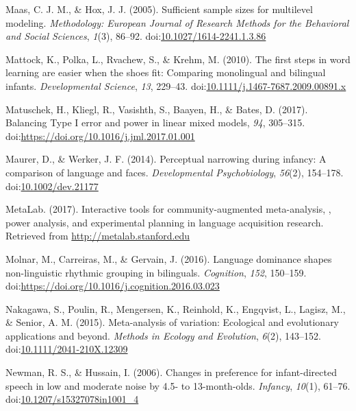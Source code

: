 \documentclass[,man,floatsintext]{apa6}
\begin{document}
\leavevmode\hypertarget{ref-maas_2005}{}%
Maas, C. J. M., \& Hox, J. J. (2005). Sufficient sample sizes for multilevel modeling. \emph{Methodology: European Journal of Research Methods for the Behavioral and Social Sciences}, \emph{1}(3), 86--92. doi:\href{https://doi.org/10.1027/1614-2241.1.3.86}{10.1027/1614-2241.1.3.86}

\leavevmode\hypertarget{ref-mattock_2010}{}%
Mattock, K., Polka, L., Rvachew, S., \& Krehm, M. (2010). The first steps in word learning are easier when the shoes fit: Comparing monolingual and bilingual infants. \emph{Developmental Science}, \emph{13}, 229--43. doi:\href{https://doi.org/10.1111/j.1467-7687.2009.00891.x}{10.1111/j.1467-7687.2009.00891.x}

\leavevmode\hypertarget{ref-matuschek_2017}{}%
Matuschek, H., Kliegl, R., Vasishth, S., Baayen, H., \& Bates, D. (2017). Balancing Type I error and power in linear mixed models, \emph{94}, 305--315. doi:\href{https://doi.org/https://doi.org/10.1016/j.jml.2017.01.001}{https://doi.org/10.1016/j.jml.2017.01.001}

\leavevmode\hypertarget{ref-maurer_2014}{}%
Maurer, D., \& Werker, J. F. (2014). Perceptual narrowing during infancy: A comparison of language and faces. \emph{Developmental Psychobiology}, \emph{56}(2), 154--178. doi:\href{https://doi.org/10.1002/dev.21177}{10.1002/dev.21177}

\leavevmode\hypertarget{ref-metalab_2017}{}%
MetaLab. (2017). Interactive tools for community-augmented meta-analysis, , power analysis, and experimental planning in language acquisition research. Retrieved from \url{http://metalab.stanford.edu}

\leavevmode\hypertarget{ref-molnar_2016}{}%
Molnar, M., Carreiras, M., \& Gervain, J. (2016). Language dominance shapes non-linguistic rhythmic grouping in bilinguals. \emph{Cognition}, \emph{152}, 150--159. doi:\href{https://doi.org/https://doi.org/10.1016/j.cognition.2016.03.023}{https://doi.org/10.1016/j.cognition.2016.03.023}

\leavevmode\hypertarget{ref-nakagawa_2015}{}%
Nakagawa, S., Poulin, R., Mengersen, K., Reinhold, K., Engqvist, L., Lagisz, M., \& Senior, A. M. (2015). Meta-analysis of variation: Ecological and evolutionary applications and beyond. \emph{Methods in Ecology and Evolution}, \emph{6}(2), 143--152. doi:\href{https://doi.org/10.1111/2041-210X.12309}{10.1111/2041-210X.12309}

\leavevmode\hypertarget{ref-newman_2006}{}%
Newman, R. S., \& Hussain, I. (2006). Changes in preference for infant-directed speech in low and moderate noise by 4.5- to 13-month-olds. \emph{Infancy}, \emph{10}(1), 61--76. doi:\href{https://doi.org/10.1207/s15327078in1001_4}{10.1207/s15327078in1001\_4}
\end{document}
